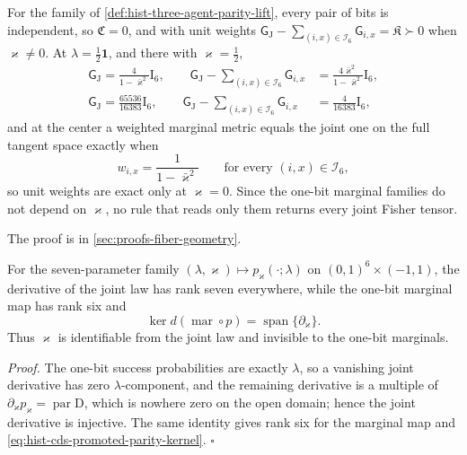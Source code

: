 For the family of \cref{def:hist-three-agent-parity-lift}, every pair of bits is
independent, so $\mathfrak C=0$, and with unit weights
$\mathsf G_{\mathrm J}-\sum_{(i,x)\in\mathcal I_6}\mathsf G_{i,x}=\mathfrak K\succ0$ when
$\varkappa\ne0$.  At $\lambda=\tfrac12\mathbf 1$, and there with $\varkappa=\tfrac12$,
\begin{align}
\mathsf G_{\mathrm J}=\frac{4}{1-\bar\varkappa^2}\mathrm I_6,
\qquad
\mathsf G_{\mathrm J}-\sum_{(i,x)\in\mathcal I_6}\mathsf G_{i,x}
&=\frac{4\bar\varkappa^2}{1-\bar\varkappa^2}\mathrm I_6,
\label{eq:hist-parity-center-fisher}\\
\mathsf G_{\mathrm J}=\frac{65536}{16383}\mathrm I_6,
\qquad
\mathsf G_{\mathrm J}-\sum_{(i,x)\in\mathcal I_6}\mathsf G_{i,x}
&=\frac{4}{16383}\mathrm I_6,
\label{eq:hist-parity-half-fisher-residual}
\end{align}
and at the center a weighted marginal metric equals the joint one on the full tangent
space exactly when
\begin{equation}
w_{i,x}=\frac{1}{1-\bar\varkappa^2}
\qquad\text{for every }(i,x)\in\mathcal I_6,
\label{eq:hist-parity-center-weight-equality}
\end{equation}
so unit weights are exact only at $\varkappa=0$.  Since the one-bit marginal families do not depend on $\varkappa$, no
rule that reads only them returns every joint Fisher tensor.  

The proof is in \cref{sec:proofs-fiber-geometry}.

For the seven-parameter family $(\lambda,\varkappa)\mapsto p_\varkappa(\cdot;\lambda)$ on
$(0,1)^6\times(-1,1)$, the derivative of the joint law has rank seven everywhere, while
the one-bit marginal map has rank six and
\begin{equation}
\ker d\left(\operatorname{mar}\circ p\right)=\operatorname{span}\{\partial_\varkappa\}.
\label{eq:hist-cds-promoted-parity-kernel}
\end{equation}
Thus $\varkappa$ is identifiable from the joint law and invisible to the one-bit
marginals.  

\noindent\emph{Proof.}
The one-bit success probabilities are exactly $\lambda$, so a vanishing joint derivative
has zero $\lambda$-component, and the remaining derivative is a multiple of
$\partial_\varkappa p_\varkappa=\operatorname{par}\mathrm D$, which is nowhere zero on the
open domain; hence the joint derivative is injective.  The same identity gives rank six
for the marginal map and \eqref{eq:hist-cds-promoted-parity-kernel}.  $\square$

